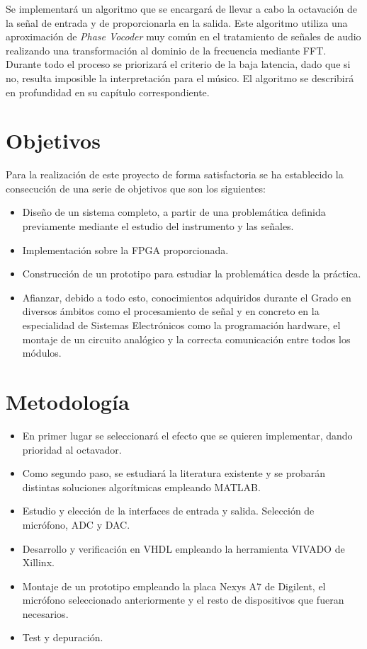Se implementará un algoritmo que se encargará de llevar a cabo la octavación de la señal de entrada y de proporcionarla en la salida. Este algoritmo utiliza una aproximación de \emph{Phase Vocoder} muy común en el tratamiento de señales de audio realizando una transformación al dominio de la frecuencia mediante FFT. Durante todo el proceso se priorizará el criterio de la baja latencia, dado que si no, resulta imposible la interpretación para el músico. El algoritmo se describirá en profundidad en su capítulo correspondiente.

\section{Objetivos}
Para la realización de este proyecto de forma satisfactoria se ha establecido la consecución de una serie de objetivos que son los siguientes:
\begin{itemize}
\item Diseño de un sistema completo, a partir de una problemática definida previamente mediante el estudio del instrumento y las señales.
\item Implementación sobre la FPGA proporcionada.
\item Construcción de un prototipo para estudiar la problemática desde la práctica.
\item Afianzar, debido a todo esto, conocimientos adquiridos durante el Grado en diversos ámbitos como el procesamiento de señal y en concreto en la especialidad de Sistemas Electrónicos como la programación hardware, el montaje de un circuito analógico y la correcta comunicación entre todos los módulos.
\end{itemize}

\section{Metodología}
\begin{itemize}
\item En primer lugar se seleccionará el efecto que se quieren implementar, dando prioridad al octavador.
\item Como segundo paso, se estudiará la literatura existente y se probarán distintas soluciones algorítmicas empleando MATLAB.
\item Estudio y elección de la interfaces de entrada y salida. Selección de micrófono, ADC y DAC.
\item Desarrollo y verificación en VHDL empleando la herramienta VIVADO de Xillinx.
\item Montaje de un prototipo empleando la placa Nexys A7 de Digilent, el micrófono seleccionado anteriormente y el resto de dispositivos que fueran necesarios.
\item Test y depuración.
\end{itemize}